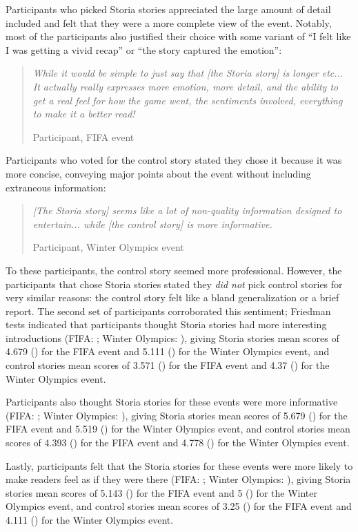 Participants who picked Storia stories appreciated the large amount of detail included and felt that they were a more complete view of the event. Notably, most of the participants also justified their choice with some variant of ``I felt like I was getting a vivid recap'' or ``the story captured the emotion'':

\begin{quote}
\emph{While it would be simple to just say that [the Storia story] is longer etc...  It actually really expresses more emotion, more detail, and the ability to get a real feel for how the game went, the sentiments involved, everything to make it a better read!}

Participant, FIFA event
\end{quote}

Participants who voted for the control story stated they chose it because it was more concise, conveying major points about the event without including extraneous information:

\begin{quote}
\emph{[The Storia story] seems like a lot of non-quality information designed to entertain... while [the control story] is more informative.}


Participant, Winter Olympics event
\end{quote}

To these participants, the control story seemed more professional. However, the participants that chose Storia stories stated they \emph{did not} pick control stories for very similar reasons: the control story felt like a bland generalization or a brief report. The second set of participants corroborated this sentiment; Friedman tests indicated that participants thought Storia stories had more interesting introductions (FIFA: ; Winter Olympics: ), giving Storia stories mean scores of 4.679 () for the FIFA event and 5.111 () for the Winter Olympics event, and control stories mean scores of 3.571 () for the FIFA event and 4.37 () for the Winter Olympics event.

Participants also thought Storia stories for these events were more informative (FIFA: ; Winter Olympics: ), giving Storia stories mean scores of 5.679 () for the FIFA event and 5.519 () for the Winter Olympics event, and control stories mean scores of 4.393 () for the FIFA event and 4.778 () for the Winter Olympics event.

Lastly, participants felt that the Storia stories for these events were more likely to make readers feel as if they were there (FIFA: ; Winter Olympics: ), giving Storia stories mean scores of 5.143 () for the FIFA event and 5 () for the Winter Olympics event, and control stories mean scores of 3.25 () for the FIFA event and 4.111 () for the Winter Olympics event.



